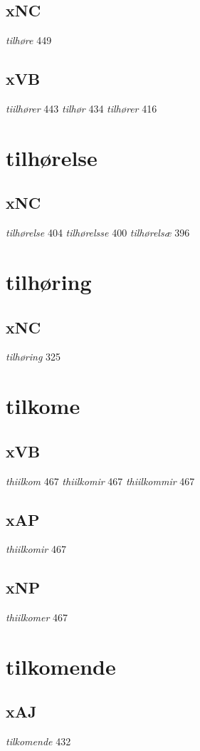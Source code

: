 \documentclass[a4paper,twocolumn]{article}
\begin{document}
\subsection{xNC}
\label{sec:org93b650b}
\emph{tilhøre} 449 
\subsection{xVB}
\label{sec:orgd4d8c5a}
\emph{tiilhører} 443 \emph{tilhør} 434 \emph{tilhører} 416 
\section{tilhørelse}
\label{sec:org1ffc444}
\subsection{xNC}
\label{sec:org9ebd036}
\emph{tilhørelse} 404 \emph{tilhørelsse} 400 \emph{tilhørelsæ} 396 
\section{tilhøring}
\label{sec:org8f7ec27}
\subsection{xNC}
\label{sec:org978543b}
\emph{tilhøring} 325 
\section{tilkome}
\label{sec:org619f9ba}
\subsection{xVB}
\label{sec:org6a547b3}
\emph{thiilkom} 467 \emph{thiilkomir} 467 \emph{thiilkommir} 467 
\subsection{xAP}
\label{sec:orgb8e6ac4}
\emph{thiilkomir} 467 
\subsection{xNP}
\label{sec:orgf94c782}
\emph{thiilkomer} 467 
\section{tilkomende}
\label{sec:org7e82b06}
\subsection{xAJ}
\label{sec:orgd882289}
\emph{tilkomende} 432 
\end{document}
